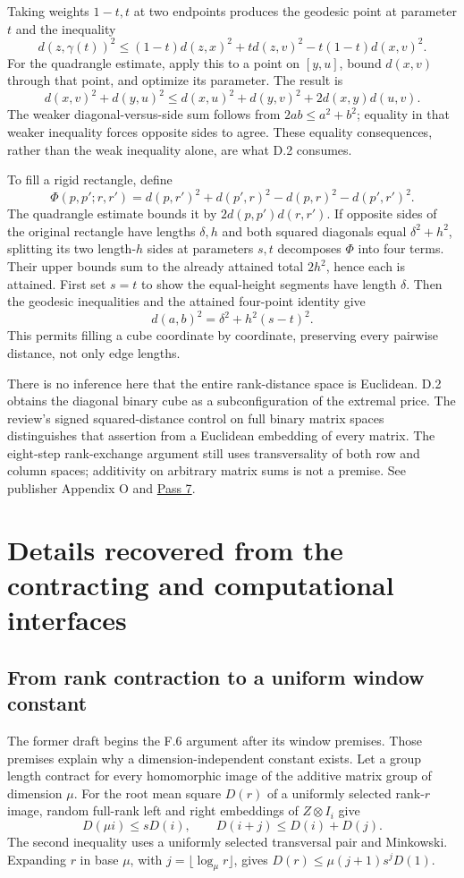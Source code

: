 \documentclass[11pt,letterpaper]{article}
\theoremstyle{definition}\newtheorem{definition}[theorem]{Definition}\newtheorem{example}[theorem]{Example}
\theoremstyle{remark}\newtheorem{remark}[theorem]{Remark}
\newcommand{\aud}[2]{\href{https://github.com/nousentllc/VP-VNP-Review/blob/567303d0bcf4f9d54390437b137752446e58ccd6/#1}{#2}}
\begin{document}
Taking weights $1-t,t$ at two endpoints produces the geodesic point at parameter $t$ and the inequality
\[
 d(z,\gamma(t))^2\le (1-t)d(z,x)^2+t d(z,v)^2-t(1-t)d(x,v)^2.
\]
For the quadrangle estimate, apply this to a point on $[y,u]$, bound $d(x,v)$ through that point, and optimize its parameter. The result is
\[
 d(x,v)^2+d(y,u)^2\le d(x,u)^2+d(y,v)^2+2d(x,y)d(u,v).
\]
The weaker diagonal-versus-side sum follows from $2ab\le a^2+b^2$; equality in that weaker inequality forces opposite sides to agree. These equality consequences, rather than the weak inequality alone, are what D.2 consumes.

To fill a rigid rectangle, define
\[
 \Phi(p,p';r,r')=d(p,r')^2+d(p',r)^2-d(p,r)^2-d(p',r')^2.
\]
The quadrangle estimate bounds it by $2d(p,p')d(r,r')$. If opposite sides of the original rectangle have lengths $\delta,h$ and both squared diagonals equal $\delta^2+h^2$, splitting its two length-$h$ sides at parameters $s,t$ decomposes $\Phi$ into four terms. Their upper bounds sum to the already attained total $2h^2$, hence each is attained. First set $s=t$ to show the equal-height segments have length $\delta$. Then the geodesic inequalities and the attained four-point identity give
\[
 d(a,b)^2=\delta^2+h^2(s-t)^2.
\]
This permits filling a cube coordinate by coordinate, preserving every pairwise distance, not only edge lengths.

There is no inference here that the entire rank-distance space is Euclidean. D.2 obtains the diagonal binary cube as a subconfiguration of the extremal price. The review's signed squared-distance control on full binary matrix spaces distinguishes that assertion from a Euclidean embedding of every matrix. The eight-step rank-exchange argument still uses transversality of both row and column spaces; additivity on arbitrary matrix sums is not a premise. See publisher Appendix O and \aud{passes/07-field-alternative.md}{Pass 7}.

\section{Details recovered from the contracting and computational interfaces}\label{sec:contractdetail}
\subsection{From rank contraction to a uniform window constant}\label{sec:windowdetail}
The former draft begins the F.6 argument after its window premises. Those premises explain why a dimension-independent constant exists. Let a group length contract for every homomorphic image of the additive matrix group of dimension $\mu$. For the root mean square $D(r)$ of a uniformly selected rank-$r$ image, random full-rank left and right embeddings of $Z\otimes I_i$ give
\[
 D(\mu i)\le sD(i),\qquad D(i+j)\le D(i)+D(j).
\]
The second inequality uses a uniformly selected transversal pair and Minkowski. Expanding $r$ in base $\mu$, with $j=\lfloor\log_\mu r\rfloor$, gives $D(r)\le\mu(j+1)s^jD(1)$.
\end{document}
